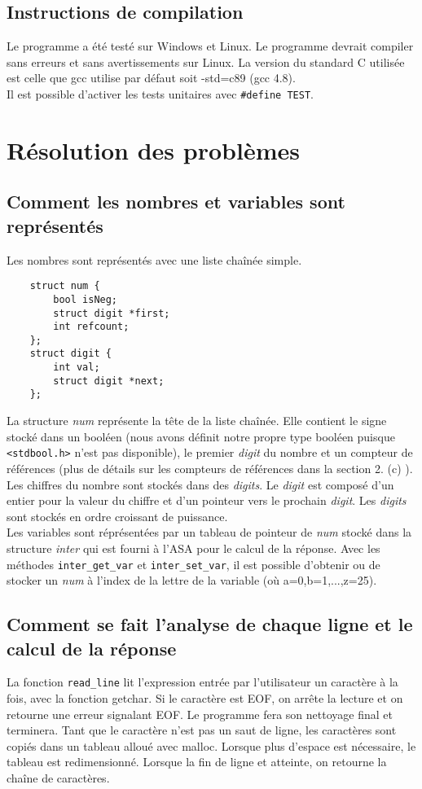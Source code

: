 \documentclass[a4paper,12pt,french]{article}
\begin{document}
	\subsection{Instructions de compilation}
	Le programme a été testé sur Windows et Linux. Le programme devrait compiler
	sans erreurs et sans avertissements sur Linux. La version du standard C
	utilisée est celle que gcc utilise par défaut soit -std=c89 (gcc 4.8).\\

	Il est possible d'activer les tests unitaires avec \lstinline$#define TEST$.
	\newpage
\section{Résolution des problèmes}
	\renewcommand{\thesubsection}{(\alph{subsection})}

	\subsection{Comment les nombres et variables sont représentés}
		Les nombres sont représentés avec une liste chaînée simple.
\begin{lstlisting}
	struct num {
	    bool isNeg;
	    struct digit *first;
	    int refcount;
	};
	struct digit {
	    int val;
	    struct digit *next;
	};
\end{lstlisting}
		La structure \textit{num} représente la tête de la liste chaînée. Elle contient le signe stocké dans un booléen (nous avons définit notre propre type booléen puisque \lstinline{<stdbool.h>} n'est pas disponible), le premier \textit{digit} du nombre et un compteur de références (plus de détails sur les compteurs de références dans la section 2. (c) ). Les chiffres du nombre sont stockés dans des \textit{digits}. Le \textit{digit} est composé d'un entier pour la valeur du chiffre et d'un pointeur vers le prochain \textit{digit}. Les \textit{digits} sont stockés en ordre croissant de puissance.\\

		Les variables sont réprésentées par un tableau de pointeur de \textit{num} stocké dans la structure \textit{inter} qui est fourni à l'ASA pour le calcul de la réponse. Avec les méthodes \lstinline$inter_get_var$ et \lstinline$inter_set_var$, il est possible d'obtenir ou de stocker un \textit{num} à l'index de la lettre de la variable (où a=0,b=1,...,z=25).
		\subsection{Comment se fait l’analyse de chaque ligne et le calcul de la réponse}
		La fonction \lstinline$read_line$ lit l'expression entrée par l'utilisateur un caractère à la fois,
		avec la fonction getchar. Si le caractère est EOF, on arrête la lecture et on retourne
		une erreur signalant EOF. Le programme fera son nettoyage final et terminera. Tant que
		le caractère n'est pas un saut de ligne, les caractères sont copiés dans un tableau
		alloué avec malloc. Lorsque plus d'espace est nécessaire, le tableau est redimensionné.
		Lorsque la fin de ligne et atteinte, on retourne la chaîne de caractères.\\
\end{document}
